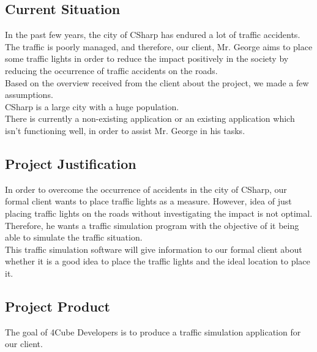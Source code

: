 \documentclass[a4paper,11pt]{article}
\begin{document}
    \subsection{Current Situation}  
    In the past few years, the city of CSharp has endured a lot of traffic accidents. The traffic is poorly managed, and therefore, our client, Mr. George aims to place some traffic lights in order to reduce the impact positively in the society by reducing the occurrence  of traffic accidents on the roads.  \\ Based on the overview received from the client about the project, we made a few assumptions. \\ CSharp is a large city with a huge population.\\ There is currently a non-existing application or an existing application which isn't functioning well, in order to assist Mr. George in his tasks.	
    
    \subsection{Project Justification}
    In order to overcome the occurrence of accidents in the city of CSharp, our formal client wants to place traffic lights as a measure. 
    However, idea of just placing traffic lights on the roads without investigating the impact is not optimal.  Therefore, he wants a traffic simulation program with the objective of it being able to simulate the traffic situation. \\
    This traffic simulation software will give information to our formal client about whether it is a good idea to  place the traffic lights and the ideal location to place it.  
    
    \subsection{Project Product}
    The goal of 4Cube Developers is to produce a traffic simulation application for our client. 
    
\end{document}
